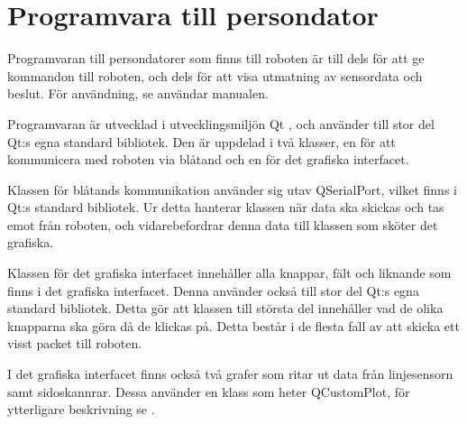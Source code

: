 \section{Programvara till persondator}
Programvaran till persondatorer som finns till roboten är till dels för att ge kommandon till roboten, och dels för att visa utmatning av sensordata och beslut. För användning, se användar manualen.

Programvaran är utvecklad i utvecklingsmiljön Qt \cite{qt}, och använder till stor del Qt:s egna standard bibliotek. Den är uppdelad i två klasser, en för att kommunicera med roboten via blåtand och en för det grafiska interfacet.

Klassen för blåtands kommunikation använder sig utav QSerialPort, vilket finns i Qt:s standard bibliotek. Ur detta hanterar klassen när data ska skickas och tas emot från roboten, och vidarebefordrar denna data till klassen som sköter det grafiska.

Klassen för det grafiska interfacet innehåller alla knappar, fält och liknande som finns i det grafiska interfacet. Denna använder också till stor del Qt:s egna standard bibliotek. Detta gör att klassen till största del innehåller vad de olika knapparna ska göra då de klickas på. Detta består i de flesta fall av att skicka ett visst packet till roboten.

I det grafiska interfacet finns också två grafer som ritar ut data från linjesensorn samt sidoskannrar. Dessa använder en klass som heter QCustomPlot, för ytterligare beskrivning se \cite{qcustomplot}.  